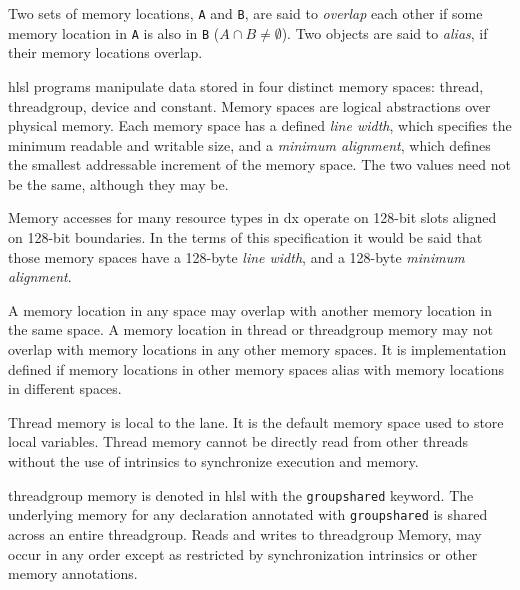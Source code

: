 \p Two sets of memory locations, \texttt{A} and \texttt{B}, are said to
\textit{overlap} each other if some memory location in \texttt{A} is also in
\texttt{B} (\(A \cap B \neq \emptyset\)). Two objects are said to
\textit{alias}, if their memory locations overlap.


\p \acrshort{hlsl} programs manipulate data stored in four distinct memory
spaces: thread, threadgroup, device and constant. Memory spaces are logical
abstractions over physical memory. Each memory space has a defined \textit{line
width}, which specifies the minimum readable and writable size, and a
\textit{minimum alignment}, which defines the smallest addressable increment of
the memory space. The two values need not be the same, although they may be.

\begin{note}
  \p Memory accesses for many resource types in \gls{dx} operate on 128-bit
  slots aligned on 128-bit boundaries. In the terms of this specification it
  would be said that those memory spaces have a 128-byte \textit{line width},
  and a 128-byte \textit{minimum alignment}.
\end{note}

\p A memory location in any space may overlap with another memory location in
the same space. A memory location in thread or threadgroup memory may not
overlap with memory locations in any other memory spaces. It is implementation
defined if memory locations in other memory spaces alias with memory locations
in different spaces.


\p Thread memory is local to the \gls{lane}. It is the default memory space used to
store local variables. Thread memory cannot be directly read from other threads
without the use of intrinsics to synchronize execution and memory.


\p \gls{threadgroup} memory is denoted in \acrshort{hlsl} with the
\texttt{groupshared} keyword. The underlying memory for any declaration
annotated with \texttt{groupshared} is shared across an entire
\gls{threadgroup}. Reads and writes to \gls{threadgroup} Memory, may occur in
any order except as restricted by synchronization intrinsics or other memory
annotations.


